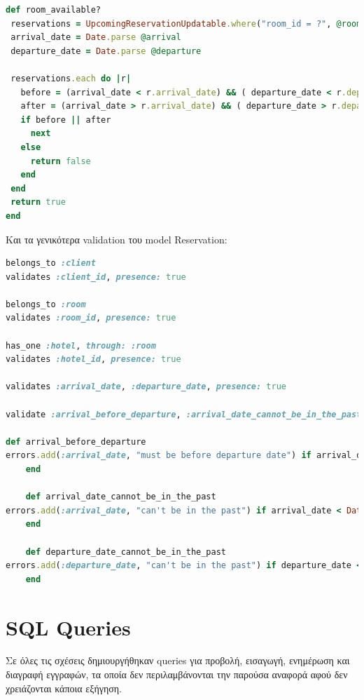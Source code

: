 \documentclass[a4paper,12pt]{article}
\begin{document}
	\begin{lstlisting}[language=Ruby]
def room_available?
 reservations = UpcomingReservationUpdatable.where("room_id = ?", @room.id)
 arrival_date = Date.parse @arrival
 departure_date = Date.parse @departure

 reservations.each do |r|
   before = (arrival_date < r.arrival_date) && ( departure_date < r.departure_date)
   after = (arrival_date > r.arrival_date) && ( departure_date > r.departure_date)
   if before || after
     next
   else
     return false
   end
 end
 return true
end
	\end{lstlisting}
	Και τα γενικότερα validation του model Reservation:
	\begin{lstlisting}[language=Ruby]
belongs_to :client
validates :client_id, presence: true

belongs_to :room
validates :room_id, presence: true

has_one :hotel, through: :room
validates :hotel_id, presence: true

validates :arrival_date, :departure_date, presence: true

validate :arrival_before_departure, :arrival_date_cannot_be_in_the_past, :departure_date_cannot_be_in_the_past

def arrival_before_departure
errors.add(:arrival_date, "must be before departure date") if arrival_date >= departure_date
 	end

 	def arrival_date_cannot_be_in_the_past
errors.add(:arrival_date, "can't be in the past") if arrival_date < Date.today
 	end

 	def departure_date_cannot_be_in_the_past
errors.add(:departure_date, "can't be in the past") if departure_date < Date.today
 	end
	\end{lstlisting}

\section{SQL Queries}
Σε όλες τις σχέσεις δημιουργήθηκαν queries για προβολή, εισαγωγή, ενημέρωση και διαγραφή εγγραφών, τα οποία δεν περιλαμβάνονται την παρούσα αναφορά αφού δεν χρειάζονται κάποια εξήγηση.
\end{document}
